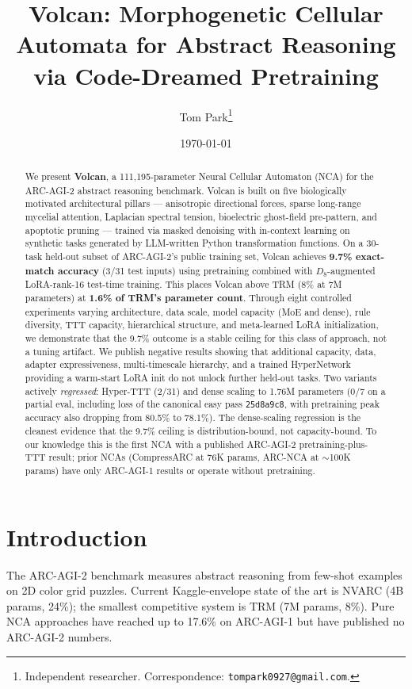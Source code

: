 \documentclass[11pt]{article}
\title{Volcan: Morphogenetic Cellular Automata for Abstract Reasoning via Code-Dreamed Pretraining}
\author{%
    Tom Park\thanks{Independent researcher. Correspondence: \texttt{tompark0927@gmail.com}.}%
}
\date{\today}
\begin{document}
\maketitle

\begin{abstract}
We present \textbf{Volcan}, a 111{,}195-parameter Neural Cellular Automaton (NCA) for the ARC-AGI-2 abstract reasoning benchmark. Volcan is built on five biologically motivated architectural pillars --- anisotropic directional forces, sparse long-range mycelial attention, Laplacian spectral tension, bioelectric ghost-field pre-pattern, and apoptotic pruning --- trained via masked denoising with in-context learning on synthetic tasks generated by LLM-written Python transformation functions. On a 30-task held-out subset of ARC-AGI-2's public training set, Volcan achieves \textbf{9.7\% exact-match accuracy} (3/31 test inputs) using pretraining combined with $D_8$-augmented LoRA-rank-16 test-time training. This places Volcan above TRM (8\% at 7M parameters) at \textbf{1.6\% of TRM's parameter count}. Through eight controlled experiments varying architecture, data scale, model capacity (MoE and dense), rule diversity, TTT capacity, hierarchical structure, and meta-learned LoRA initialization, we demonstrate that the 9.7\% outcome is a stable ceiling for this class of approach, not a tuning artifact. We publish negative results showing that additional capacity, data, adapter expressiveness, multi-timescale hierarchy, and a trained HyperNetwork providing a warm-start LoRA init do not unlock further held-out tasks. Two variants actively \emph{regressed}: Hyper-TTT (2/31) and dense scaling to 1.76M parameters (0/7 on a partial eval, including loss of the canonical easy pass \texttt{25d8a9c8}, with pretraining peak accuracy also dropping from 80.5\% to 78.1\%). The dense-scaling regression is the cleanest evidence that the 9.7\% ceiling is distribution-bound, not capacity-bound. To our knowledge this is the first NCA with a published ARC-AGI-2 pretraining-plus-TTT result; prior NCAs (CompressARC at 76K params, ARC-NCA at $\sim$100K params) have only ARC-AGI-1 results or operate without pretraining.
\end{abstract}

\section{Introduction}
\label{sec:intro}

The ARC-AGI-2 benchmark \citep{chollet2025arcagi2} measures abstract reasoning from few-shot examples on 2D color grid puzzles. Current Kaggle-envelope state of the art is NVARC \citep{sorokin2025nvarc} (4B params, 24\%); the smallest competitive system is TRM \citep{jolicoeur2025trm} (7M params, 8\%). Pure NCA approaches \citep{guichard2025arcnca,liao2025compressarc} have reached up to 17.6\% on ARC-AGI-1 but have published no ARC-AGI-2 numbers.
\end{document}
